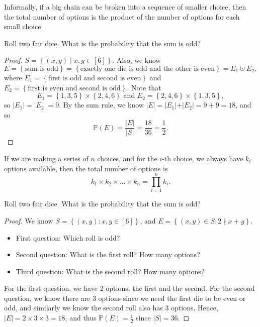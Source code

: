 \begin{remark}
    Informally, if a big chain can be broken into a sequence of smaller choice, then the total number of options is the product of the number of options for each small choice.
\end{remark}

\begin{eg}
    Roll two fair dice. What is the probability that the sum is odd?
\end{eg}
\begin{proof}
    \(S = \left\{ (x, y) \mid x, y \in \left[ 6 \right]  \right\} \). Also, we know 
    \[
        E = \left\{ \text{sum is odd}  \right\} = \left\{ \text{exactly one die is odd and the other is even}  \right\} = E_1 \cupdot E_2,  
    \] 
    where \(E_1 = \left\{ \text{first is odd and second is even}  \right\} \) and \(E_2 = \left\{ \text{first is even and second is odd}  \right\} \). Note that 
    \[
        E_1 = \left\{ 1, 3, 5 \right\} \times \left\{ 2, 4, 6 \right\} \text{ and } E_2 = \left\{ 2, 4, 6 \right\} \times \left\{ 1, 3, 5 \right\},     
    \]  
    so \(\vert E_1 \vert = \vert E_2 \vert = 9  \). By the sum rule, we know \(\vert E \vert = \vert E_1 \vert + \vert E_2 \vert = 9 + 9 = 18  \), and so 
    \[
        \mathbb{P} (E) = \frac{\vert E \vert }{\vert S \vert } = \frac{18}{36} = \frac{1}{2}.
    \]  
\end{proof}

\begin{theorem}
    If we are making a series of \(n\) choices, and for the \(i\)-th choice, we always have \(k_i\) options available, then the total number of options is
    \[
        k_1 \times k_2 \times \dots \times k_n = \prod _{i=1}^n k_i.
    \]  
\end{theorem}

\begin{eg}
    Roll two fair dice. What is the probability that the sum is odd?
\end{eg}
\begin{proof}
    We know \(S = \left\{ (x, y) : x, y \in [6] \right\} \), and \(E = \left\{ (x, y) \in S: 2 \nmid x+ y \right\} \). 
    \begin{itemize}
        \item First question: Which roll is odd? 
        \item Second question: What is the first roll? How many options? 
        \item Third question: What is the second roll? How many options?
    \end{itemize}  
    For the first question, we have \(2\) options, the first and the second. For the second question, we know there are \(3\) options since we need the first die to be even or odd, and similarly we know the second roll also has \(3\) options. Hence, \( \vert E \vert = 2 \times 3 \times 3 = 18\), and thus \(\mathbb{P} (E) = \frac{1}{2}\) since \(\vert S \vert = 36 \).  
\end{proof}

